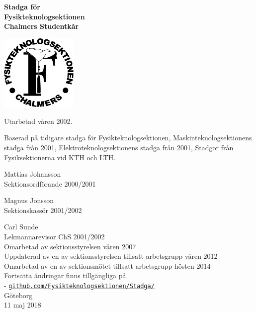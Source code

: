 \documentclass[11pt,a4paper]{article}
\begin{document}

\setlength{\headheight}{14pt}

  \begin{center}
    \textbf{\Huge{Stadga för}}\\[3mm]
    \textbf{\Huge{Fysikteknologsektionen}}\\
    \vspace{.7 cm}
    \textbf{\Large{Chalmers Studentkår}}

    \vspace{1.25em}
    \includegraphics[width=10em]{sektionslogo.eps}
    \vspace{1.25em}

    Utarbetad våren 2002.
    
    Baserad på tidigare stadga för Fysikteknologsektionen,
    Maskinteknologsektionens stadga från 2001, Elektroteknologsektionens
    stadga från 2001, Stadgor från Fysiksektionerna vid KTH och LTH.

    Mattias Johansson\\
    Sektionsordförande 2000/2001

    Magnus Jonsson\\
    Sektionskassör 2001/2002

    Carl Sunde\\

    Lekmannarevisor ChS 2001/2002\\[5mm]
    Omarbetad av sektionsstyrelsen våren 2007\\[5mm]
    Uppdaterad av en av sektionsstyrelsen tillsatt arbetsgrupp våren 2012\\[5mm]
    Omarbetad av en av sektionsmötet tillsatt arbetsgrupp hösten 2014\\[5mm]
    Fortsatta ändringar finns tillgängliga på\\
-    \href{https://github.com/Fysikteknologsektionen/Stadga/commits/master}{\texttt{github.com/Fysikteknologsektionen/Stadga/}}\\[5mm]  

    \vspace{.3 cm}
    \small{Göteborg}\\
    \small{11 maj 2018}
  \end{center}
\end{document}
